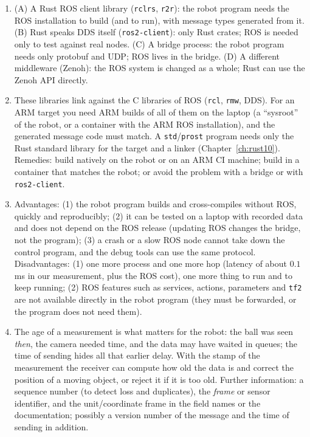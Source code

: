 \begin{enumerate}[label=\textbf{\ansnum.\arabic*}]
  \item (A) A Rust ROS client library (\verb!rclrs!, \verb!r2r!): the robot program needs the ROS installation to build (and to run), with message types generated from it. (B) Rust speaks DDS itself (\verb!ros2-client!): only Rust crates; ROS is needed only to test against real nodes. (C) A bridge process: the robot program needs only protobuf and UDP; ROS lives in the bridge. (D) A different middleware (Zenoh): the ROS system is changed as a whole; Rust can use the Zenoh API directly.
  \item These libraries link against the C libraries of ROS (\verb!rcl!, \verb!rmw!, DDS). For an ARM target you need ARM builds of all of them on the laptop (a ``sysroot'' of the robot, or a container with the ARM ROS installation), and the generated message code must match. A \verb!std!/\verb!prost! program needs only the Rust standard library for the target and a linker (Chapter~\ref{ch:rust10}). Remedies: build natively on the robot or on an ARM CI machine; build in a container that matches the robot; or avoid the problem with a bridge or with \verb!ros2-client!.
  \item Advantages: (1) the robot program builds and cross-compiles without ROS, quickly and reproducibly; (2) it can be tested on a laptop with recorded data and does not depend on the ROS release (updating ROS changes the bridge, not the program); (3) a crash or a slow ROS node cannot take down the control program, and the debug tools can use the same protocol. Disadvantages: (1) one more process and one more hop (latency of about $0.1$\,ms in our measurement, plus the ROS cost), one more thing to run and to keep running; (2) ROS features such as services, actions, parameters and \verb!tf2! are not available directly in the robot program (they must be forwarded, or the program does not need them).
  \item The age of a measurement is what matters for the robot: the ball was seen \emph{then}, the camera needed time, and the data may have waited in queues; the time of sending hides all that earlier delay. With the stamp of the measurement the receiver can compute how old the data is and correct the position of a moving object, or reject it if it is too old. Further information: a sequence number (to detect loss and duplicates), the \emph{frame} or sensor identifier, and the unit/coordinate frame in the field names or the documentation; possibly a version number of the message and the time of sending in addition.

\end{enumerate}

